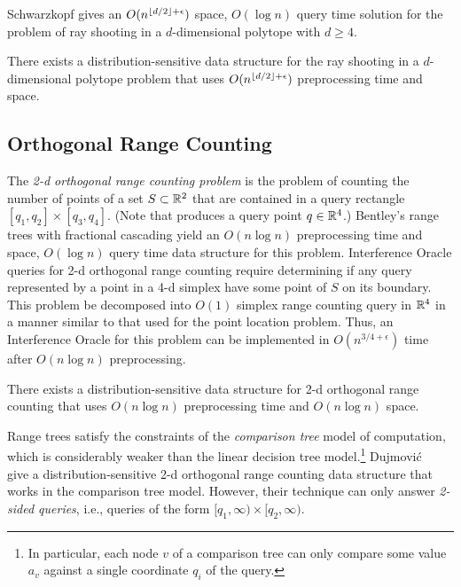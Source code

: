 \documentclass{patmorin}
\begin{document}
Schwarzkopf gives an $O(n^{{\left\lfloor d/2 \right\rfloor}+\epsilon})$ space, $O(\log n)$ query
time solution for the problem of ray shooting in a $d$-dimensional
polytope with $d \ge 4$.

\begin{thm}
  There exists a distribution-sensitive data structure for the
  ray shooting in a $d$-dimensional polytope problem that uses
  $O(n^{{\left\lfloor d/2 \right\rfloor}+\epsilon})$ preprocessing time and space.
\end{thm}

\subsection{Orthogonal Range Counting}

The \emph{2-d orthogonal range counting problem} is the problem of
counting the number of points of a set $S\subset\mathbb{R}^2$ that are contained
in a query rectangle $[q_1,q_2]\times[q_3,q_4]$. (Note that produces
a query point $q\in \mathbb{R}^4$.) Bentley's range trees \cite{b75} with
fractional cascading \cite{cg86,l78} yield an $O(n\log n)$ preprocessing
time and space, $O(\log n)$ query time data structure for this problem.
Interference Oracle queries for 2-d orthogonal range counting require
determining if any query represented by a point in a 4-d simplex have some
point of $S$ on its boundary.  This problem be decomposed into $O(1)$
simplex range counting query in $\mathbb{R}^4$ in a manner similar to that used
for the point location problem.  Thus, an Interference Oracle for this
problem can be implemented in $O(n^{3/4+\epsilon})$ time after $O(n\log
n)$ preprocessing.

\begin{thm}
  There exists a distribution-sensitive data structure for 2-d orthogonal
  range counting that uses $O(n\log n)$ preprocessing time and
  $O(n\log n)$ space.
\end{thm}

Range trees satisfy the constraints of the \emph{comparison tree} model of
computation, which is considerably weaker than the linear decision tree
model.\footnote{In particular, each node $v$ of a comparison tree can
only compare some value $a_v$ against a single coordinate $q_i$ of the
query.} Dujmovi\'c \etal\ \cite{dhm09} give a distribution-sensitive 2-d
orthogonal range counting data structure that works in the comparison
tree model.  However, their technique can only answer \emph{2-sided
queries}, i.e., queries of the form $[q_1,\infty)\times[q_2,\infty)$.
\end{document}
